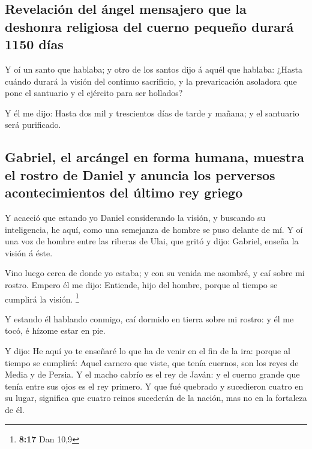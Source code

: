 \hypertarget{revelaciuxf3n-del-uxe1ngel-mensajero-que-la-deshonra-religiosa-del-cuerno-pequeuxf1o-duraruxe1-1150-duxedas}{%
\subsection{Revelación del ángel mensajero que la deshonra religiosa del
cuerno pequeño durará 1150
días}\label{revelaciuxf3n-del-uxe1ngel-mensajero-que-la-deshonra-religiosa-del-cuerno-pequeuxf1o-duraruxe1-1150-duxedas}}

 Y oí un santo que hablaba; y otro de los santos dijo á
aquél que hablaba: ¿Hasta cuándo durará la visión del continuo
sacrificio, y la prevaricación asoladora que pone el santuario y el
ejército para ser hollados?

 Y él me dijo: Hasta dos mil y trescientos días de tarde y
mañana; y el santuario será purificado.

\hypertarget{gabriel-el-arcuxe1ngel-en-forma-humana-muestra-el-rostro-de-daniel-y-anuncia-los-perversos-acontecimientos-del-uxfaltimo-rey-griego}{%
\subsection{Gabriel, el arcángel en forma humana, muestra el rostro de
Daniel y anuncia los perversos acontecimientos del último rey
griego}\label{gabriel-el-arcuxe1ngel-en-forma-humana-muestra-el-rostro-de-daniel-y-anuncia-los-perversos-acontecimientos-del-uxfaltimo-rey-griego}}

 Y acaeció que estando yo Daniel considerando la visión, y
buscando su inteligencia, he aquí, como una semejanza de hombre se puso
delante de mí.  Y oí una voz de hombre entre las riberas de
Ulai, que gritó y dijo: Gabriel, enseña la visión á éste.

 Vino luego cerca de donde yo estaba; y con su venida me
asombré, y caí sobre mi rostro. Empero él me dijo: Entiende, hijo del
hombre, porque al tiempo se cumplirá la visión. \footnote{\textbf{8:17}
  Dan 10,9}

 Y estando él hablando conmigo, caí dormido en tierra sobre
mi rostro: y él me tocó, é hízome estar en pie.

 Y dijo: He aquí yo te enseñaré lo que ha de venir en el
fin de la ira: porque al tiempo se cumplirá:  Aquel carnero
que viste, que tenía cuernos, son los reyes de Media y de Persia.
 Y el macho cabrío es el rey de Javán: y el cuerno grande
que tenía entre sus ojos es el rey primero.  Y que fué
quebrado y sucedieron cuatro en su lugar, significa que cuatro reinos
sucederán de la nación, mas no en la fortaleza de él.

